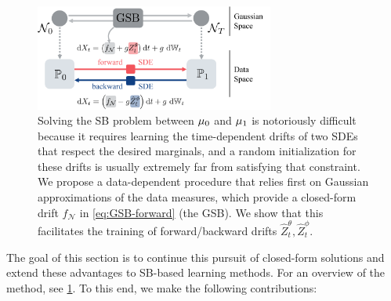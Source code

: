 \begin{figure}[t]
    \centering
    \includegraphics[width=0.7\textwidth]{figures/fig_overview_gsb.pdf}
    \caption{Solving the \acrshort{SB} problem between $\mu_0$ and $\mu_1$ is notoriously difficult because it requires learning the time-dependent drifts of two SDEs that respect the desired marginals, and a random initialization for these drifts is usually extremely far from satisfying that constraint. We propose a data-dependent procedure that relies first on Gaussian approximations of the data measures, which provide a closed-form drift $f_{\mathcal{N}}$ in \eqref{eq:GSB-forward} (the \acrshort{GSB}). We show that this facilitates the training of forward/backward drifts $\hat{Z}^\theta_t, \hat{Z}^\phi_t$.}
    \label{fig:overview_gsbflow}
\end{figure}

The goal of this section is to continue this pursuit of closed-form solutions and extend these advantages to \acrshort{SB}-based learning methods. For an overview of the method, see \cref{fig:overview_gsbflow}. To this end, we make the following contributions: \\

